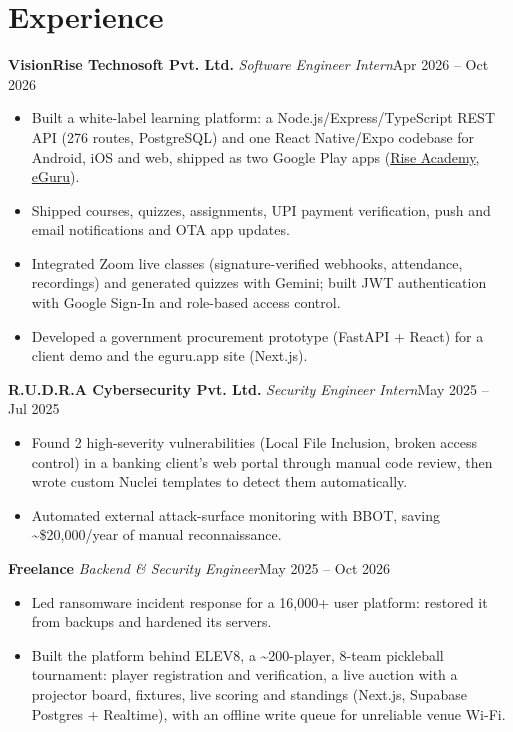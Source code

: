 \documentclass[10pt, a4paper]{article}
\newcommand{\role}[3]{\par\vspace{2.5pt}\textbf{#1} \textbar{} \textit{#2}\hfill #3\par}
\newcommand{\lnk}[2]{\href{#1}{\color{linkc}#2}}
\begin{document}
\section{Experience}
\role{VisionRise Technosoft Pvt. Ltd.}{Software Engineer Intern}{Apr 2026 -- Oct 2026}
\begin{itemize}
  \item Built a white-label learning platform: a Node.js/Express/TypeScript REST API (276 routes, PostgreSQL) and one React Native/Expo codebase for Android, iOS and web, shipped as two Google Play apps (\lnk{https://play.google.com/store/apps/details?id=tech.riseinstitute.app}{Rise Academy}, \lnk{https://play.google.com/store/apps/details?id=app.eguru.lms}{eGuru}).
  \item Shipped courses, quizzes, assignments, UPI payment verification, push and email notifications
  and OTA app updates.
  \item Integrated Zoom live classes (signature-verified webhooks, attendance, recordings) and generated quizzes with Gemini;
  built JWT authentication with Google Sign-In and role-based access control.
  \item Developed a government procurement prototype (FastAPI + React) for a client demo and the eguru.app site (Next.js).
\end{itemize}

\role{R.U.D.R.A Cybersecurity Pvt. Ltd.}{Security Engineer Intern}{May 2025 -- Jul 2025}
\begin{itemize}
  \item Found 2 high-severity vulnerabilities (Local File Inclusion, broken access control) in a banking client's web
  portal through manual code review, then wrote custom Nuclei templates to detect them automatically.
  \item Automated external attack-surface monitoring with BBOT, saving \textasciitilde{}\$20,000/year of manual reconnaissance.
\end{itemize}

\role{Freelance}{Backend \& Security Engineer}{May 2025 -- Oct 2026}
\begin{itemize}
  \item Led ransomware incident response for a 16,000+ user platform: restored it from backups and hardened its servers.
  \item Built the platform behind ELEV8, a \textasciitilde{}200-player, 8-team pickleball tournament: player registration and verification, a live
  auction with a projector board, fixtures, live scoring and standings (Next.js, Supabase Postgres + Realtime), with an offline write queue for unreliable venue Wi-Fi.
\end{itemize}
\end{document}
